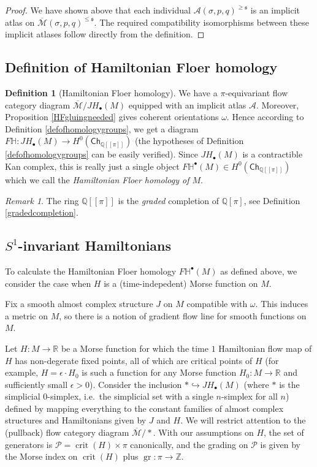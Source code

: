 \documentclass[12pt]{article}
\theoremstyle{definition}
\newtheorem{definition}[theorem]{Definition}
\theoremstyle{remark}
\newtheorem{remark}[theorem]{Remark}
\numberwithin{equation}{subsection}
\newcommand{\s}{\mathfrak s}
\newcommand{\ZZ}{\mathbb Z}
\newcommand{\RR}{\mathbb R}
\newcommand{\QQ}{\mathbb Q}
\newcommand{\HH}{\mathbb H}
\newcommand{\PPP}{\mathcal P}
\newcommand{\A}{\mathcal A}
\newcommand{\Mbar}{\overline{\mathcal M}}
\newcommand{\Ch}{\mathsf{Ch}}
\newcommand{\crit}{\operatorname{crit}}
\newcommand{\gr}{\operatorname{gr}}
\newcommand{\JH}{J\!H}
\begin{document}
\begin{proof}
We have shown above that each individual $\A(\sigma,p,q)^{\geq\s}$ is an implicit atlas on $\Mbar(\sigma,p,q)^{\leq\s}$.  The required compatibility isomorphisms between these implicit atlases follow directly from the definition.
\end{proof}

\subsection{Definition of Hamiltonian Floer homology}

\begin{definition}[Hamiltonian Floer homology]
We have a $\pi$-equivariant flow category diagram $\Mbar/\JH_\bullet(M)$ equipped with an implicit atlas $\A$.  Moreover, Proposition \ref{HFgluingneeded} gives coherent orientations $\omega$.  Hence according to Definition \ref{defofhomologygroups}, we get a diagram $F\HH:\JH_\bullet(M)\to H^0(\Ch_{\QQ[[\pi]]})$ (the hypotheses of Definition \ref{defofhomologygroups} can be easily verified).  Since $\JH_\bullet(M)$ is a contractible Kan complex, this is really just a single object $F\HH^\bullet(M)\in H^0(\Ch_{\QQ[[\pi]]})$ which we call the \emph{Hamiltonian Floer homology of $M$}.
\end{definition}

\begin{remark}
The ring $\QQ[[\pi]]$ is the \emph{graded} completion of $\QQ[\pi]$, see Definition \ref{gradedcompletion}.
\end{remark}

\subsection{\texorpdfstring{$S^1$}{S{\textasciicircum}1}-invariant Hamiltonians}\label{SSham}

To calculate the Hamiltonian Floer homology $F\HH^\bullet(M)$ as defined above, we consider the case when $H$ is a (time-indepedent) Morse function on $M$.

Fix a smooth almost complex structure $J$ on $M$ compatible with $\omega$.  This induces a metric on $M$, so there is a notion of gradient flow line for smooth functions on $M$.

Let $H:M\to\RR$ be a Morse function for which the time $1$ Hamiltonian flow map of $H$ has non-degerate fixed points, all of which are critical points of $H$ (for example, $H=\epsilon\cdot H_0$ is such a function for any Morse function $H_0:M\to\RR$ and sufficiently small $\epsilon>0$).  Consider the inclusion $\ast\hookrightarrow\JH_\bullet(M)$ (where $\ast$ is the simplicial $0$-simplex, i.e.\ the simplicial set with a single $n$-simplex for all $n$) defined by mapping everything to the constant families of almost complex structures and Hamiltonians given by $J$ and $H$.  We will restrict attention to the (pullback) flow category diagram $\Mbar/\ast$.  With our assumptions on $H$, the set of generators is $\PPP=\crit(H)\times\pi$ canonically, and the grading on $\PPP$ is given by the Morse index on $\crit(H)$ plus $\gr:\pi\to\ZZ$.
\end{document}
